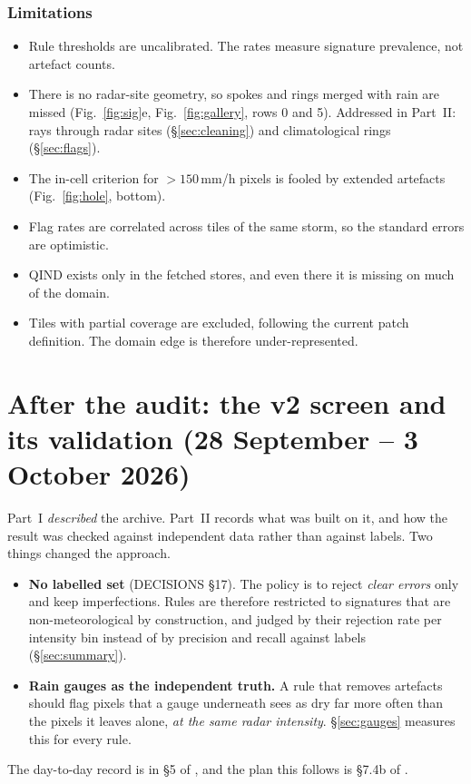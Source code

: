 \documentclass[11pt,a4paper]{article}
\theoremstyle{definition}
\theoremstyle{remark}
\newcommand{\1}{\mathbf{1}}
\newcommand{\code}[1]{\texttt{\detokenize{#1}}}
\begin{document}
\section{Limitations}
\begin{itemize}[nosep]
\item Rule thresholds are uncalibrated. The rates measure signature prevalence, not artefact
  counts.
\item There is no radar-site geometry, so spokes and rings merged with rain are missed
  (Fig.~\ref{fig:sig}e, Fig.~\ref{fig:gallery}, rows 0 and 5). Addressed in Part~II: rays
  through radar sites (\S\ref{sec:cleaning}) and climatological rings (\S\ref{sec:flags}).
\item The in-cell criterion for $>150$\,mm/h pixels is fooled by extended artefacts
  (Fig.~\ref{fig:hole}, bottom).
\item Flag rates are correlated across tiles of the same storm, so the standard errors are
  optimistic.
\item QIND exists only in the fetched stores, and even there it is missing on much of the
  domain.
\item Tiles with partial coverage are excluded, following the current patch definition. The
  domain edge is therefore under-represented.
\end{itemize}

\part{After the audit: the v2 screen and its validation (28 September -- 3 October 2026)}
\sloppy  %

Part~I \emph{described} the archive. Part~II records what was built on it, and how the
result was checked against independent data rather than against labels. Two things changed
the approach.
\begin{itemize}[nosep]
\item \textbf{No labelled set} (DECISIONS \S17). The policy is to reject \emph{clear errors}
  only and keep imperfections. Rules are therefore restricted to signatures that are
  non-meteorological by construction, and judged by their rejection rate per intensity bin
  instead of by precision and recall against labels (\S\ref{sec:summary}).
\item \textbf{Rain gauges as the independent truth.} A rule that removes artefacts should
  flag pixels that a gauge underneath sees as dry far more often than the pixels it leaves
  alone, \emph{at the same radar intensity}. \S\ref{sec:gauges} measures this for every rule.
\end{itemize}
The day-to-day record is in \S5 of \code{EXPERIMENTS.md}, and the plan this follows is
\S7.4b of \code{RESEARCH_NOTES.md}.
\end{document}
